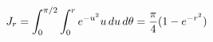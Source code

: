 \documentclass[preview]{standalone}
\begin{document}
\begin{align*}
\special{dvisvgm:raw <g id='unique000'>}J_r=\int_0^{\pi/2}\int_0^r e^{-u^2}u\,du\,d\theta=\frac{\pi}{4}(1-e^{-r^2})\special{dvisvgm:raw </g>}
\end{align*}
\end{document}
